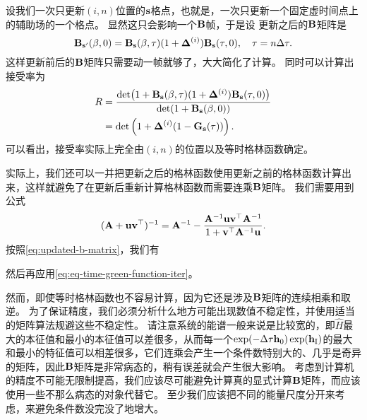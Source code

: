 \documentclass[hyperref, UTF8, a4paper]{ctexart}
\begin{document}
设我们一次只更新$(i, n)$位置的$\vb{s}$格点，也就是，一次只更新一个固定虚时间点上的辅助场的一个格点。
显然这只会影响一个$\vb{B}$帧，于是设
更新之后的$\vb{B}$矩阵是
\begin{equation}
    \vb{B}_{\vb{s}'}(\beta, 0) = \vb{B}_{\vb{s}}(\beta, \tau) (1 + \vb{\Delta}^{(i)}) \vb{B}_{\vb{s}}(\tau, 0), \quad \tau = n \Delta \tau.
    \label{eq:updated-b-matrix}
\end{equation}
这样更新前后的$\vb{B}$矩阵只需要动一帧就够了，大大简化了计算。
同时可以计算出接受率为
\begin{equation}
    \begin{aligned}
        R &= \frac{\det(1 + \vb{B}_{\vb{s}}(\beta, \tau) (1 + \vb{\Delta}^{(i)}) \vb{B}_{\vb{s}}(\tau, 0))}{\det(1 + \vb{B}_{\vb{s}}(\beta, 0))} \\
        &= \det \left( 1 + \vb{\Delta}^{(i)} (1 - \vb{G}_{\vb{s}}(\tau)) \right).
    \end{aligned}
\end{equation}
可以看出，接受率实际上完全由$(i, n)$的位置以及等时格林函数确定。

实际上，我们还可以一并把更新之后的格林函数使用更新之前的格林函数计算出来，这样就避免了在更新后重新计算格林函数而需要连乘$\vb{B}$矩阵。
我们需要用到公式
\[
    (\vb{A} + \vb{u} \vb{v}^\top)^{-1} = \vb{A}^{-1} - \frac{\vb{A}^{-1} \vb{u} \vb{v}^\top \vb{A}^{-1}}{1 + \vb{v}^\top \vb{A}^{-1} \vb{u}}.
\]
按照\eqref{eq:updated-b-matrix}，我们有

然后再应用\eqref{eq:eq-time-green-function-iter}。%

然而，即使等时格林函数也不容易计算，因为它还是涉及$\vb{B}$矩阵的连续相乘和取逆。
为了保证精度，我们必须分析什么地方可能出现数值不稳定性，并使用适当的矩阵算法规避这些不稳定性。
请注意系统的能谱一般来说是比较宽的，即$\hat{H}$最大的本征值和最小的本征值可以差很多，从而每一个$\exp(-\Delta \tau \vb{h}_0) \exp(\vb{h}_\text{I})$的最大和最小的特征值可以相差很多，它们连乘会产生一个条件数特别大的、几乎是奇异的矩阵，因此$\vb{B}$矩阵是非常病态的，稍有误差就会产生很大影响。
考虑到计算机的精度不可能无限制提高，我们应该尽可能避免计算真的显式计算$\vb{B}$矩阵，而应该使用一些不那么病态的对象代替它。
至少我们应该把不同的能量尺度分开来考虑，来避免条件数没完没了地增大。
\end{document}
